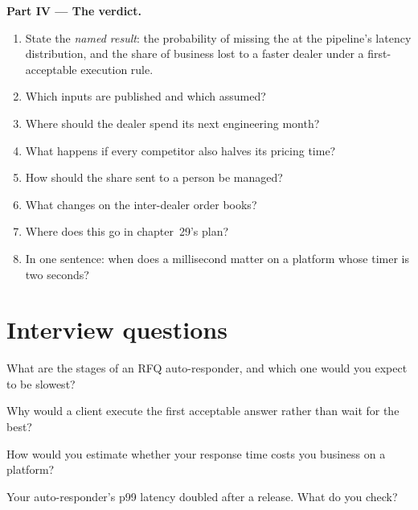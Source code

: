 \begin{problem}
\medskip\noindent\textbf{Part IV --- The verdict.}
\begin{enumerate}[resume]
\item State the \emph{named result}: the probability of missing the  at the pipeline's latency distribution, and the share
  of business lost to a faster dealer under a first-acceptable execution rule.
\item Which inputs are published and which assumed?
\item Where should the dealer spend its next engineering month?
\item What happens if every competitor also halves its pricing time?
\item How should the share sent to a person be managed?
\item What changes on the inter-dealer order books?
\item Where does this go in chapter~29's plan?
\item In one sentence: when does a millisecond matter on a platform whose timer is two seconds?
\end{enumerate}
\end{problem}

\section{Interview questions}

\begin{interviewq}\label{iq:nw:fixed-income-and-rfq-platform-connectivity:1}
What are the stages of an RFQ auto-responder, and which one would you expect to be slowest?
\end{interviewq}

\begin{interviewq}\label{iq:nw:fixed-income-and-rfq-platform-connectivity:2}
Why would a client execute the first acceptable answer rather than wait for the best?
\end{interviewq}

\begin{interviewq}\label{iq:nw:fixed-income-and-rfq-platform-connectivity:3}
How would you estimate whether your response time costs you business on a platform?
\end{interviewq}

\begin{interviewq}\label{iq:nw:fixed-income-and-rfq-platform-connectivity:4}
Your auto-responder's p99 latency doubled after a release. What do you check?
\end{interviewq}

